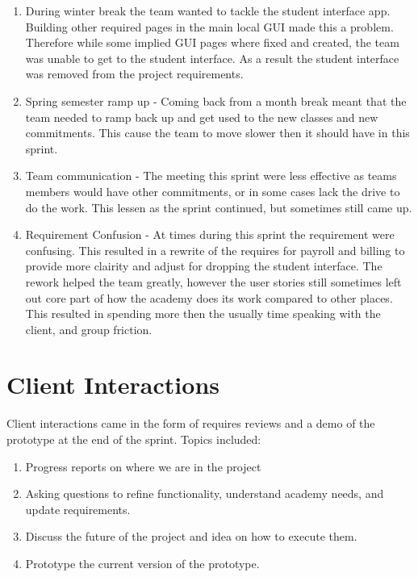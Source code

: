\documentclass[11pt]{book}
\begin{document}
\begin{enumerate}
\item During winter break the team wanted to tackle the student interface app. Building other required pages in the main local GUI made this a problem. Therefore while some implied GUI pages where fixed and created, the team was unable to get to the student interface. As a result the student interface was removed from the project requirements.
\item Spring semester ramp up - Coming back from a month break meant that the team needed to ramp back up and get used to the new classes and new commitments. This cause the team to move slower then it should have in this sprint. 
\item Team communication - The meeting this sprint were less effective as teams members would have other commitments, or in some cases lack the drive to do the work. This lessen as the sprint continued, but sometimes still came up.
\item Requirement Confusion - At times during this sprint the requirement were confusing. This resulted in a rewrite of the requires for payroll and billing to provide more clairity and adjust for dropping the student interface. The rework helped the team greatly, however the user stories still sometimes left out core part of how the academy does its work compared to other places. This resulted in spending more then the usually time speaking with the client, and group friction.
\end{enumerate}

\section{Client Interactions}

Client interactions came in the form of requires reviews and a demo of the prototype at the end of the sprint. Topics included:

\begin{enumerate}
\item Progress reports on where we are in the project
\item Asking questions to refine functionality, understand academy needs, and update requirements.
\item Discuss the future of the project and idea on how to execute them.
\item Prototype the current version of the prototype.
\end{enumerate}
\end{document}
